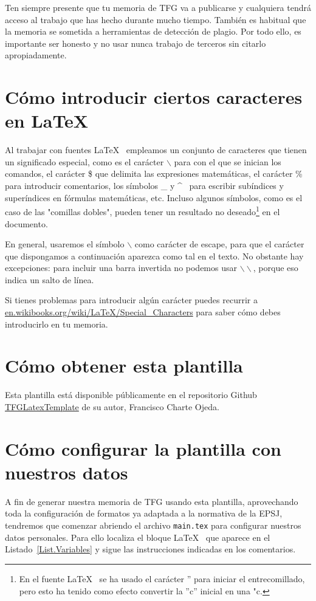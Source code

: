 Ten siempre presente que tu memoria de TFG va a publicarse y cualquiera tendrá acceso al trabajo que has hecho durante mucho tiempo. También es habitual que la memoria se sometida a herramientas de detección de plagio. Por todo ello, es importante ser honesto y no usar nunca trabajo de terceros sin citarlo apropiadamente.

\section{Cómo introducir ciertos caracteres en \LaTeX}

Al trabajar con fuentes \LaTeX~ empleamos un conjunto de caracteres que tienen un significado especial, como es el carácter $\backslash$ para con el que se inician los comandos, el carácter \$ que delimita las expresiones matemáticas, el carácter \% para introducir comentarios, los símbolos \_ y \^~ para escribir subíndices y superíndices en fórmulas matemáticas, etc. Incluso algunos símbolos, como es el caso de las "comillas dobles", pueden tener un resultado no deseado\footnote{En el fuente \LaTeX~ se ha usado el carácter '' para iniciar el entrecomillado, pero esto ha tenido como efecto convertir la ''c'' inicial en una "c.} en el documento.

En general, usaremos el símbolo $\backslash$ como carácter de escape, para que el carácter que dispongamos a continuación aparezca como tal en el texto. No obstante hay excepciones: para incluir una barra invertida no podemos usar $\backslash\backslash$, porque eso indica un salto de línea.

Si tienes problemas para introducir algún carácter puedes recurrir a \url{en.wikibooks.org/wiki/LaTeX/Special_Characters} para saber cómo debes introducirlo en tu memoria.

\section{Cómo obtener esta plantilla}

Esta plantilla está disponible públicamente en el repositorio Github \href{https://github.com/fcharte/TFGLatexTemplate/releases}{TFGLatexTemplate} de su autor, Francisco Charte Ojeda.

\section{Cómo configurar la plantilla con nuestros datos}

A fin de generar nuestra memoria de TFG usando esta plantilla, aprovechando toda la configuración de formatos ya adaptada a la normativa de la EPSJ, tendremos que comenzar abriendo el archivo \texttt{main.tex} para configurar nuestros datos personales. Para ello localiza el bloque \LaTeX~ que aparece en el Listado~\ref{List.Variables} y sigue las instrucciones indicadas en los comentarios.

